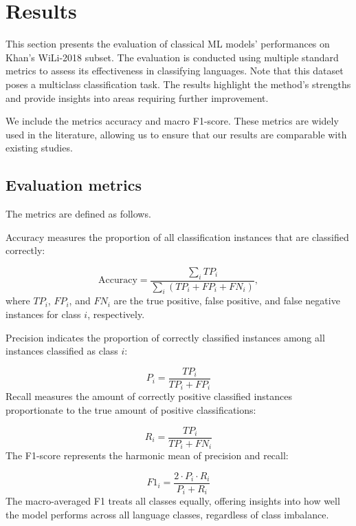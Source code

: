 \section{Results}
This section presents the evaluation of classical ML models' performances on Khan's WiLi-2018 subset. The evaluation is conducted using multiple standard metrics to assess its effectiveness in classifying languages. Note that this dataset poses a multiclass classification task. The results highlight the method's strengths and provide insights into areas requiring further improvement.

We include the metrics accuracy and macro F1-score. These metrics are widely used in the literature, allowing us to ensure that our results are comparable with existing studies. \cite{Jauhiainen2019}

\subsection{Evaluation metrics}
The metrics are defined as follows.

Accuracy measures the proportion of all classification instances that are classified correctly:

\begin{equation}
    \text{Accuracy} = \frac{\sum_{i} TP_i}{\sum_{i} (TP_i + FP_i + FN_i)},
\end{equation}
where $TP_i$, $FP_i$, and $FN_i$ are the true positive, false positive, and false negative instances for class $i$, respectively. 

Precision indicates the proportion of correctly classified instances among all instances classified as class $i$:

\begin{equation}
    P_i = \frac{TP_i}{TP_i + FP_i}
\end{equation}
Recall measures the amount of correctly positive classified instances proportionate to the true amount of positive classifications:

\begin{equation}
    R_i = \frac{TP_i}{TP_i + FN_i}
\end{equation}
The F1-score represents the harmonic mean of precision and recall:

\begin{equation}
    F1_i = \frac{2 \cdot P_i \cdot R_i}{P_i + R_i}
\end{equation}
The macro-averaged F1 treats all classes equally, offering insights into how well the model performs across all language classes, regardless of class imbalance.


